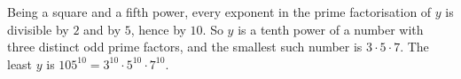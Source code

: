 Being a square and a fifth power, every exponent in the prime factorisation of $y$ is divisible by $2$ and by $5$, hence by $10$. So $y$ is a tenth power of a number with three distinct odd prime factors, and the smallest such number is $3\cdot5\cdot7$. The least $y$ is $\boxed{105^{10}=3^{10}\cdot5^{10}\cdot7^{10}}$.
